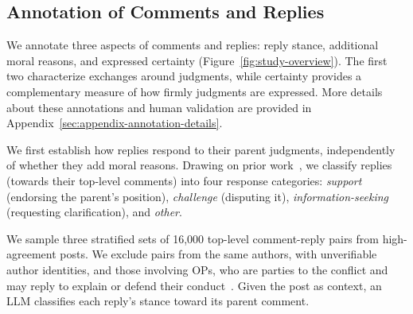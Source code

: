 \subsection{Annotation of Comments and Replies}
\label{subsec:method-annotation}

We annotate three aspects of comments and replies: reply stance, additional moral reasons, and expressed certainty (Figure~\ref{fig:study-overview}). The first two characterize exchanges around judgments, while certainty provides a complementary measure of how firmly judgments are expressed.
More details about these annotations and human validation are provided in Appendix~\ref{sec:appendix-annotation-details}.




We first establish how replies respond to their parent judgments,
independently of whether they add moral reasons. Drawing on prior work~\citep{andreas2012annotating}, we classify replies (towards their top-level comments) into four response categories:
\emph{support} (endorsing the parent's position), \emph{challenge}
(disputing it), \emph{information-seeking} (requesting clarification), and
\emph{other}.

We sample three stratified sets of 16,000 top-level comment-reply
pairs from high-agreement posts. We exclude pairs from the same authors, with unverifiable author identities, and those involving OPs, who are parties to the conflict and may reply to explain or defend their conduct~\citep{giorgi2023author}. %
Given the post as context, an LLM classifies each reply's stance toward its parent comment.


